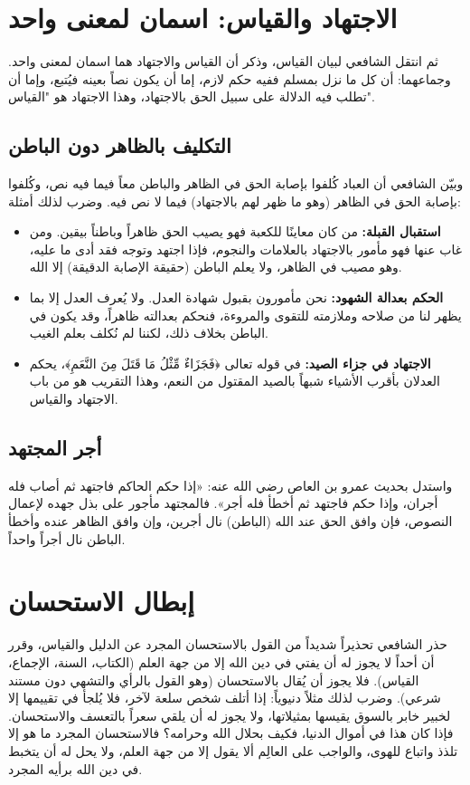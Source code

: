 \section{الاجتهاد والقياس: اسمان لمعنى واحد}
ثم انتقل الشافعي لبيان القياس، وذكر أن القياس والاجتهاد هما اسمان لمعنى واحد. وجماعهما: أن كل ما نزل بمسلم ففيه حكم لازم، إما أن يكون نصاً بعينه فيُتبع، وإما أن تطلب فيه الدلالة على سبيل الحق بالاجتهاد، وهذا الاجتهاد هو "القياس".

\subsection{التكليف بالظاهر دون الباطن}
وبيّن الشافعي أن العباد كُلفوا بإصابة الحق في الظاهر والباطن معاً فيما فيه نص، وكُلفوا بإصابة الحق في الظاهر (وهو ما ظهر لهم بالاجتهاد) فيما لا نص فيه.
وضرب لذلك أمثلة:
\begin{itemize}
    \item \textbf{استقبال القبلة:} من كان معاينًا للكعبة فهو يصيب الحق ظاهراً وباطناً بيقين. ومن غاب عنها فهو مأمور بالاجتهاد بالعلامات والنجوم، فإذا اجتهد وتوجه فقد أدى ما عليه، وهو مصيب في الظاهر، ولا يعلم الباطن (حقيقة الإصابة الدقيقة) إلا الله.
    \item \textbf{الحكم بعدالة الشهود:} نحن مأمورون بقبول شهادة العدل. ولا يُعرف العدل إلا بما يظهر لنا من صلاحه وملازمته للتقوى والمروءة، فنحكم بعدالته ظاهراً، وقد يكون في الباطن بخلاف ذلك، لكننا لم نُكلف بعلم الغيب.
    \item \textbf{الاجتهاد في جزاء الصيد:} في قوله تعالى ﴿فَجَزَاءٌ مِّثْلُ مَا قَتَلَ مِنَ النَّعَمِ﴾، يحكم العدلان بأقرب الأشياء شبهاً بالصيد المقتول من النعم، وهذا التقريب هو من باب الاجتهاد والقياس.
\end{itemize}

\subsection{أجر المجتهد}
واستدل بحديث عمرو بن العاص رضي الله عنه: «إذا حكم الحاكم فاجتهد ثم أصاب فله أجران، وإذا حكم فاجتهد ثم أخطأ فله أجر». فالمجتهد مأجور على بذل جهده لإعمال النصوص، فإن وافق الحق عند الله (الباطن) نال أجرين، وإن وافق الظاهر عنده وأخطأ الباطن نال أجراً واحداً.

\section{إبطال الاستحسان}
حذر الشافعي تحذيراً شديداً من القول بالاستحسان المجرد عن الدليل والقياس، وقرر أن أحداً لا يجوز له أن يفتي في دين الله إلا من جهة العلم (الكتاب، السنة، الإجماع، القياس).
فلا يجوز أن يُقال بالاستحسان (وهو القول بالرأي والتشهي دون مستند شرعي). وضرب لذلك مثلاً دنيوياً: إذا أتلف شخص سلعة لآخر، فلا يُلجأ في تقييمها إلا لخبير خابر بالسوق يقيسها بمثيلاتها، ولا يجوز له أن يلقي سعراً بالتعسف والاستحسان. فإذا كان هذا في أموال الدنيا، فكيف بحلال الله وحرامه؟
فالاستحسان المجرد ما هو إلا تلذذ واتباع للهوى، والواجب على العالِم ألا يقول إلا من جهة العلم، ولا يحل له أن يتخبط في دين الله برأيه المجرد.